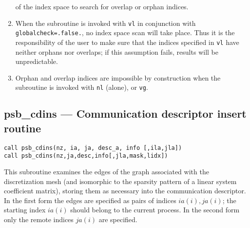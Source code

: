 \begin{enumerate}
  of the index   space to search for overlap or orphan indices.
\item When the subroutine is invoked with \verb|vl| in
  conjunction with \verb|globalcheck=.false.|, no index space scan
  will take place. Thus it is the responsibility of the user to make
  sure that the indices specified in \verb|vl| have neither orphans nor
  overlaps; if this assumption fails, results will be 
  unpredictable. 
\item Orphan and overlap indices are
  impossible by construction when the subroutine is invoked with
  \verb|nl| (alone),  or \verb|vg|.
\end{enumerate}


%
%
\clearpage\subsection{psb\_cdins --- Communication descriptor insert
  routine}

\begin{verbatim}
call psb_cdins(nz, ia, ja, desc_a, info [,ila,jla])
call psb_cdins(nz,ja,desc,info[,jla,mask,lidx])
\end{verbatim}

This subroutine examines the edges of the graph associated with the
discretization mesh (and isomorphic to the sparsity pattern of a
linear system coefficient matrix), storing them as necessary into the
communication descriptor. In the first form the edges are specified as
pairs of indices $ia(i),ja(i)$; the starting index $ia(i)$ should
belong to the current process. 
In the second form only the remote indices $ja(i)$ are specified. 

